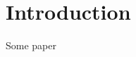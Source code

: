 \documentclass[letterpaper]{article}
\begin{document}
	\maketitle

	\pagestyle{fancy}

	\thispagestyle{empty}

	\begin{abstract}
		\lipsum[1]
	\end{abstract}
	
	\section{Introduction}
	
	\lipsum[1]

	\medskip


	Some paper \cite{einstein, dirac}

	\printbibliography


	\lipsum[1]

	\inputminted{octave}{codes/default.py}
\end{document}

